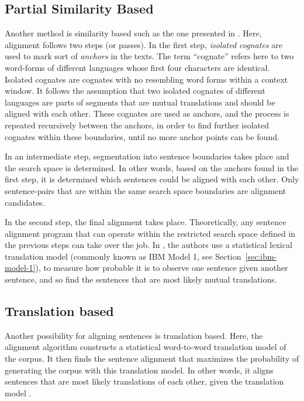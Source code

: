 \subsection{Partial Similarity Based}
Another method is similarity based such as the one presented in \cite{simard-plamondon-1996-bilingual}. 
Here, alignment follows two steps (or passes). 
In the first step, \emph{isolated cognates} are used to mark sort of \emph{anchors} in the texts. 
The term \enquote{cognate} refers here to two word-forms of different languages whose  first four characters are identical. 
Isolated cognates are cognates with no resembling word forms within a context window.
It follows the assumption that two isolated cognates of different languages are parts of segments that are mutual translations and should be aligned with each other. 
These cognates are used as anchors, and the process is repeated recursively between the anchors, in order to find further isolated cognates within these boundaries, until no more anchor points can be found.

In an intermediate step, segmentation into sentence boundaries takes place and the search space is determined. 
In other words, based on the anchors found in the first step, it is determined which sentences could be aligned with each other. 
Only sentence-pairs that are within the same search space boundaries are alignment candidates.

In the second step, the final alignment takes place. 
Theoretically, any sentence alignment program that can operate within the restricted search space defined in the previous steps can take over the job. 
In \cite{simard-plamondon-1996-bilingual}, the authors use a statistical lexical translation model (commonly known as IBM Model 1, see Section~\ref{sec:ibm-model-1}), to measure how probable it is to observe one sentence given another sentence, and so find the sentences that are most likely mutual translations.

\subsection{Translation based}

Another possibility for aligning sentences is translation based. 
Here, the alignment algorithm constructs a statistical word-to-word translation model of the corpus. 
It then finds the sentence alignment that maximizes the probability of generating the corpus with this translation model. 
In other words, it aligns sentences that are most likely translations of each other, given the translation model \autocite{chen-1993-aligning}. 

